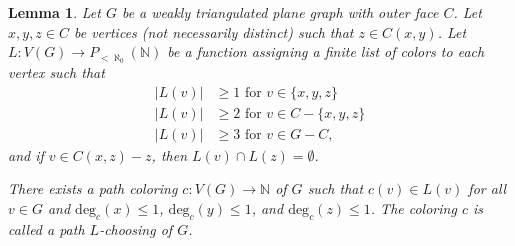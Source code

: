 \documentclass[12pt,letterpaper]{article}
\theoremstyle{plain}
\newtheorem{lemma}{Lemma}[section]           %
\theoremstyle{definition}
\theoremstyle{break}
\begin{document}
\begin{lemma}\label{L:hartman3}
Let $G$ be a weakly triangulated plane graph with outer face
$C$. Let $x,y,z\in C$ be vertices (not necessarily distinct) such that
$z\in C(x,y)$. Let $L:V(G)\to P_{<\aleph_0}(\mathbb{N})$ be a
function assigning a finite list of colors to
each vertex such that
\begin{align*}
    |L(v)| &\ge 1 \text{ for } v\in\{x,y,z\} \\
    |L(v)| &\ge 2 \text{ for } v\in C-\{x,y,z\} \\
    |L(v)| &\ge 3 \text{ for } v\in G-C,
\end{align*}
and if $v\in C(x,z)-z$, then $L(v)\cap L(z)=\emptyset$.

There exists a path coloring $c:V(G)\to\mathbb{N}$ of $G$ such
that $c(v)\in L(v)$ for all $v\in G$ and $\text{deg}_c(x)\le 1$,
$\text{deg}_c(y)\le 1$, and $\text{deg}_c(z)\le 1$. The coloring
$c$ is called a path $L$-choosing of $G$.
\end{lemma}
\end{document}
